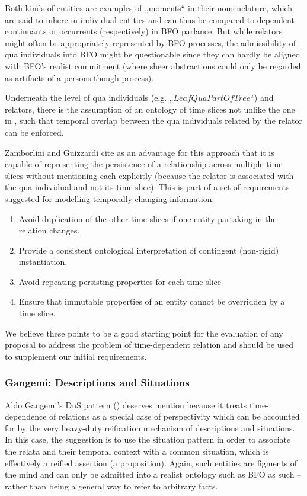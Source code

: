 \documentclass{ao2e}
\newcommand{\mclass}[1]{\ensuremath{\mathit{#1}}}
\begin{document}
Both kinds of entities are examples of „moments“ in their
nomenclature, which are said to inhere in individual entities and can thus be
compared to dependent continuants or occurrents (respectively) in BFO
parlance. But while relators might often be appropriately represented by BFO
processes, the admissibility of qua individuals into BFO might be questionable
since they can hardly be aligned with BFO's realist commitment (where sheer
abstractions could only be regarded as artifacts of a persons though process). 

Underneath the level of qua individuals (e.g. „$\mclass{LeafQuaPartOfTree}$“)
and relators, there is the assumption of an ontology of time slices not unlike
the one in \cite{Welty:2006}, such that
temporal overlap between the qua individuals related by the relator can be
enforced.

Zamborlini and Guizzardi cite as an advantage for this approach that it is capable
of representing the persistence of a relationship across multiple time slices
without mentioning each explicitly (because the relator is associated with the
qua-individual and not its time slice). This is part of a set of requirements
suggested for modelling temporally changing information:

\begin{enumerate}
\item Avoid duplication of the other time slices if one entity partaking in the
relation changes.
\item Provide a consistent ontological interpretation of contingent (non-rigid)
instantiation.
\item Avoid repeating persisting properties for each time slice
\item Ensure that immutable properties of an entity cannot be overridden by a
time slice.
\end{enumerate}

We believe these points to be a good starting point for the evaluation of
any proposal to address the problem of time-dependent relation and should be
used to supplement our initial requirements.

\subsubsection{Gangemi: Descriptions and Situations}
Aldo Gangemi's DnS pattern (\cite{Gangemi:DnS}) deserves mention because it treats
time-dependence of relations as a special case of perspectivity which can be
accounted for by the very heavy-duty reification mechanism of descriptions and
situations. In this case, the suggestion is to use the situation pattern in
order to associate the relata and their temporal context with a common
situation, which is effectively a reified assertion (a proposition). Again, such
entities are figments of the mind and can only be admitted into a realist
ontology such as BFO as such -- rather than being a general way to refer to
arbitrary facts. 
\end{document}
